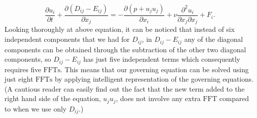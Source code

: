 \documentclass[12pt]{article}
\begin{document}
\begin{equation}\label{eight-FFTs}
\dfrac{\partial u_i}{\partial t} + \dfrac{\partial (D_{ij}-E_{ij})}{\partial x_j} = -\dfrac{\partial (p+u_ju_j)}{\partial x_i} + \nu\dfrac{\partial^2 u_i}{\partial x_j\partial x_j} + F_i.
\end{equation}
Looking thoroughly at above equation, it can be noticed that instead of six independent components that we had for $D_{ij}$, in $D_{ij}-E_{ij}$ any of the diagonal components can be obtained through the subtraction of the other two diagonal components, so $D_{ij}-E_{ij}$ has just five independent terms which consequently requires five $\text{FFTs}$. This means that our governing equation can be solved using just eight $\text{FFTs}$ by applying  intelligent representation of the governing equations.(A cautious reader can easily find out the fact that the new term added to the right hand side of the equation, $u_ju_j$, does not involve any extra $\text{FFT}$ compared to when we use only $D_{ij}$.)
\end{document}
